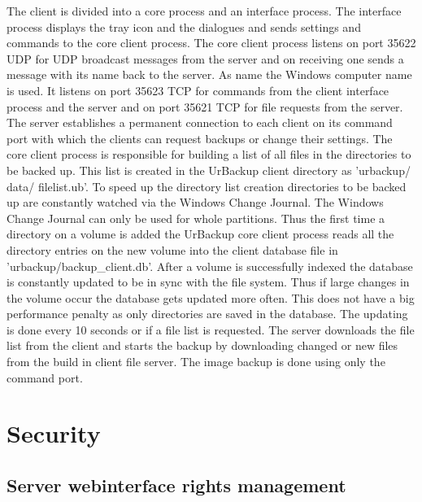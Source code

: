 \documentclass[a4paper,10pt]{article} \usepackage[breaklinks=true]{hyperref}
\begin{document}
The client is divided into a core process and an interface process. The
interface process displays the tray icon and the dialogues and sends settings and
commands to the core client process. The core client process listens on port
35622 UDP for UDP broadcast messages from the server and on receiving one sends
a message with its name back to the server. As name the Windows computer name is
used. It listens on port 35623 TCP for commands from the client interface
process and the server and on port 35621 TCP for file requests from the server.
The server establishes a permanent connection to each client on its command port
with which the clients can request backups or change their settings. The core
client process is responsible for building a list of all files in the
directories to be backed up. This list is created in the UrBackup client
directory as 'urbackup/ data/ filelist.ub'. To speed up the directory list
creation directories to be backed up are constantly watched via the Windows
Change Journal. The Windows Change Journal can only be used for whole
partitions. Thus the first time a directory on a volume is added the UrBackup
core client process reads all the directory entries on the new volume into the
client database file in 'urbackup/backup\_client.db'. After a volume is
successfully indexed the database is constantly updated to be in sync with the
file system. Thus if large changes in the volume occur the database gets updated
more often. This does not have a big performance penalty as only directories are
saved in the database. The updating is done every 10 seconds or if a file list
is requested. The server downloads the file list from the client and starts the
backup by downloading changed or new files from the build in client file server.
The image backup is done using only the command port.

\section{Security}
\label{sec_security}

\subsection{Server webinterface rights management}
\end{document}
